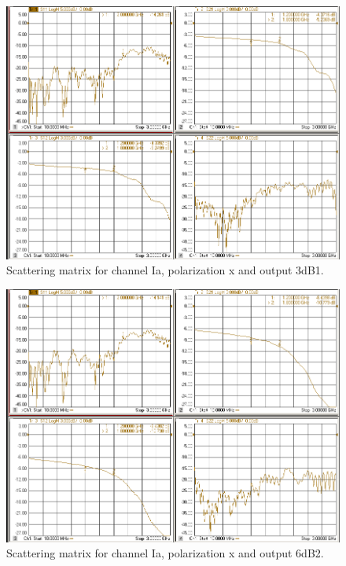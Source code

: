 \documentclass[12pt,a4paper,oneside]{article}
\begin{document}
\begin{figure}[H]
\centering
\includegraphics[width=0.9\linewidth]{VNA_results/Iax_3dB1.png}
\caption{Scattering matrix for channel Ia, polarization x and output 3dB1.}
\label{fig:Iax_3dB1}
\end{figure}


\begin{figure}[H]
\centering
\includegraphics[width=0.9\linewidth]{VNA_results/Iax_6dB2.png}
\caption{Scattering matrix for channel Ia, polarization x and output 6dB2.}
\label{fig:Iax_6dB2}
\end{figure}
\end{document}

